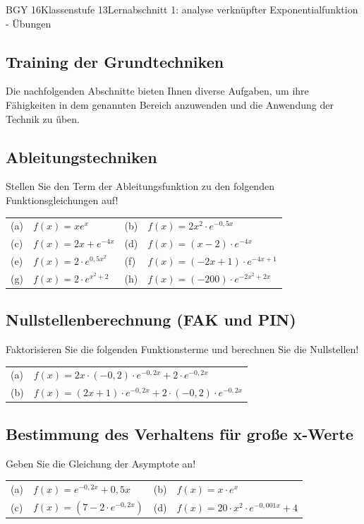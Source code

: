 \documentclass[oneside,openany,headings=optiontotoc,11pt,numbers=noenddot]{scrreprt}
\begin{document}
	\begin{worksheet}{BGY 16}{Klassenstufe 13}{Lernabschnitt 1: analyse verknüpfter Exponentialfunktion - Übungen}
				
		\noindent
		\sffamily
		\begin{framed}
			\noindent
			\section{Training der Grundtechniken}
			Die nachfolgenden Abschnitte bieten Ihnen diverse Aufgaben, um ihre Fähigkeiten in dem genannten Bereich anzuwenden und die Anwendung der Technik zu üben.
			\subsection{Ableitungstechniken}
			Stellen Sie den Term der Ableitungsfunktion zu den folgenden Funktionsgleichungen auf!\\
			\par\noindent
			\begin{tabularx}{\textwidth}{lXlX}
				(a) & \(f(x) = xe^x\) & (b) & \(f(x) = 2x^2\cdot{}e^{-0,5x}\)\\
				(c) & \(f(x) = 2x+e^{-4x}\) & (d) & \(f(x) = (x-2)\cdot{}e^{-4x}\)\\
				(e) & \(f(x) = 2\cdot{}e^{0,5x^2}\) & (f) & \(f(x) = (-2x+1)\cdot{}e^{-4x+1}\)\\
				(g) & \(f(x) = 2\cdot{}e^{x^2+2}\) & (h) & \(f(x) = (-200)\cdot{}e^{-2x^2+2x}\)\\
			\end{tabularx}
			\subsection{Nullstellenberechnung (FAK und PIN)}
			Faktorisieren Sie die folgenden Funktionsterme und berechnen Sie die Nullstellen!\\
			\par\noindent
			\begin{tabularx}{\textwidth}{lX}
				(a) & \(f(x) = 2x\cdot{}(-0,2)\cdot{}e^{-0,2x} + 2\cdot{}e^{-0,2x}\)\\
				(b) & \(f(x) = (2x+1)\cdot{}e^{-0,2x} + 2\cdot{}(-0,2)\cdot{}e^{-0,2x}\)\\
			\end{tabularx}
			\subsection{Bestimmung des Verhaltens für große x-Werte}
			Geben Sie die Gleichung der Asymptote an!\\
			\par\noindent
			\begin{tabularx}{\textwidth}{lXlX}
				(a) & \(f(x) = e^{-0,2x}+0,5x\) & (b) & \(f(x) = x\cdot{}e^x\)\\
				(c) & \(f(x) = (7-2\cdot{}e^{-0,2x})\) & (d) & \(f(x) = 20\cdot{}x^2\cdot{}e^{-0,001x}+4\)\\
			\end{tabularx}			

\end{framed}
\end{worksheet}
\end{document}

